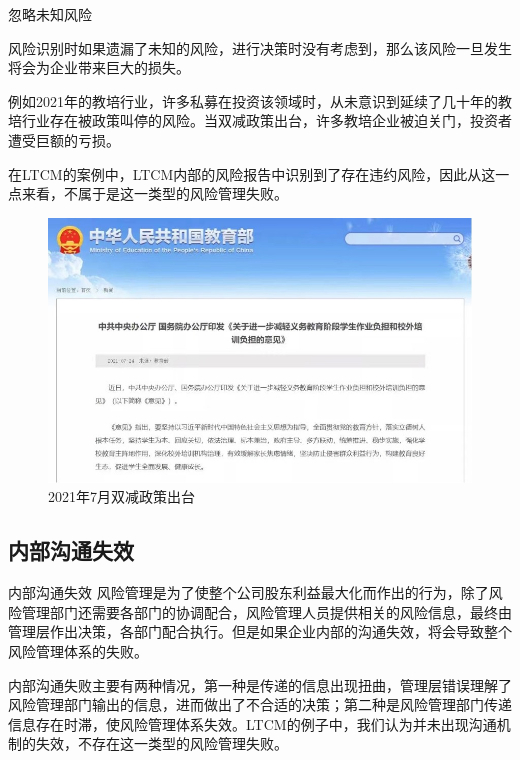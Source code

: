 \begin{frame}{忽略未知风险}

    风险识别时如果遗漏了未知的风险，进行决策时没有考虑到，那么该风险一旦发生将会为企业带来巨大的损失。
    
    例如2021年的教培行业，许多私募在投资该领域时，从未意识到延续了几十年的教培行业存在被政策叫停的风险。当双减政策出台，许多教培企业被迫关门，投资者遭受巨额的亏损。

    在LTCM的案例中，LTCM内部的风险报告中识别到了存在违约风险，因此从这一点来看，不属于是这一类型的风险管理失败。
    \begin{figure}
        \centering
        \includegraphics[width=0.4\linewidth]{img/图片 1.jpg}
        \caption{2021年7月双减政策出台}
    \end{figure}
    
\end{frame}
\subsection{内部沟通失效}\label{sec:3}
\begin{frame}{内部沟通失效}
    风险管理是为了使整个公司股东利益最大化而作出的行为，除了风险管理部门还需要各部门的协调配合，风险管理人员提供相关的风险信息，最终由管理层作出决策，各部门配合执行。但是如果企业内部的沟通失效，将会导致整个风险管理体系的失败。
    
    内部沟通失败主要有两种情况，第一种是传递的信息出现扭曲，管理层错误理解了风险管理部门输出的信息，进而做出了不合适的决策；第二种是风险管理部门传递信息存在时滞，使风险管理体系失效。LTCM的例子中，我们认为并未出现沟通机制的失效，不存在这一类型的风险管理失败。
\end{frame}